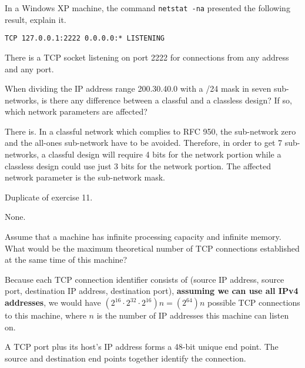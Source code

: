 \begin{Exercise}
In a Windows XP machine, the command \texttt{netstat -na} presented the following result, explain it.

\texttt{TCP 127.0.0.1:2222 0.0.0.0:* LISTENING}
\end{Exercise}
\begin{Answer}
There is a TCP socket listening on port 2222 for connections from any address and any port.
\end{Answer}

\begin{Exercise}
When dividing the IP address range 200.30.40.0 with a /24 mask in seven sub-networks, is there any difference between a classful and a classless design?
If so, which network parameters are affected?
\end{Exercise}
\begin{Answer}
There is. In a classful network which complies to RFC 950, the sub-network zero and the all-ones sub-network have to be avoided.
Therefore, in order to get 7 sub-networks, a classful design will require 4 bits for the network portion while a classless design could use just 3 bits for the network portion.
The affected network parameter is the sub-network mask.
\end{Answer}

\begin{Exercise}
Duplicate of exercise 11.
\end{Exercise}
\begin{Answer}
None.
\end{Answer}

\begin{Exercise}
Assume that a machine has infinite processing capacity and infinite memory.
What would be the maximum theoretical number of TCP connections established at the same time of this machine?
\end{Exercise}
\begin{Answer}
Because each TCP connection identifier consists of (source IP address, source port, destination IP address, destination port), \textbf{assuming we can use all IPv4 addresses}, we would have \(\left(2^{16} \cdot 2^{32} \cdot 2^{16}\right) n = \left(2^{64}\right) n\) possible TCP connections to this machine, where \(n\) is the number of IP addresses this machine can listen on.

\begin{displayquote}
A TCP port plus its host's IP address forms a 48-bit unique end point.
The source and destination end points together identify the connection.
\cite[p.~557]{computer-networks-tanenbaum-2012}
\end{displayquote}
\end{Answer}

